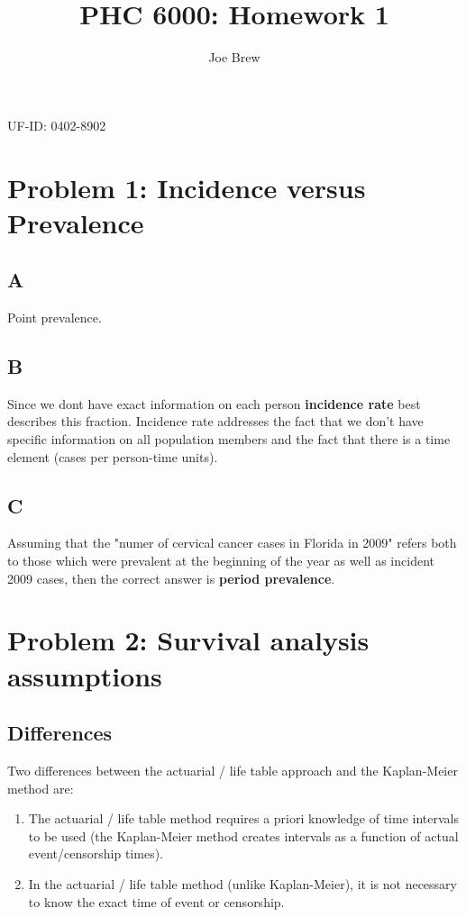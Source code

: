 \documentclass[12pt]{article}
\title{PHC 6000: Homework 1}
\author{Joe Brew}
\begin{document}

\maketitle
\begin{center}
UF-ID: 0402-8902
\end{center}

\vspace{30mm}
\tableofcontents

\newpage
\section*{Problem 1: Incidence versus Prevalence}

\subsection*{A}
Point prevalence.

\subsection*{B}
Since we dont have exact information on each person \textbf{incidence rate} best describes this fraction.  Incidence rate addresses the fact that we don't have specific information on all population members and the fact that there is a time element (cases per person-time units). 

\subsection*{C}
Assuming that the "numer of cervical cancer cases in Florida in 2009" refers both to those which were prevalent at the beginning of the year as well as incident 2009 cases, then the correct answer is \textbf{period prevalence}.

\section*{Problem 2: Survival analysis assumptions}
\subsection*{Differences}
Two differences between the actuarial / life table approach and the Kaplan-Meier method are: 
\begin{enumerate}
\item The actuarial / life table method requires a priori knowledge of time intervals to be used (the Kaplan-Meier method creates intervals as a function of actual event/censorship times).
\item In the actuarial / life table method (unlike Kaplan-Meier), it is not necessary to know the exact time of event or censorship.  \\
\end{enumerate}
\end{document}
